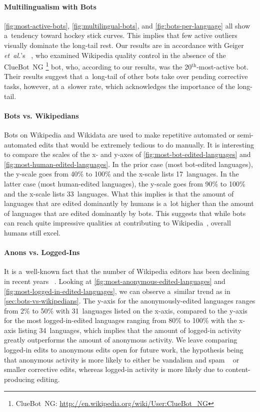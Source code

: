 \documentclass{sig-alternate}
\newcommand{\superscript}[1]{\ensuremath{^{\textrm{#1}}}}
\newcommand{\inlinelistingsize}{\fontsize{8pt}{11pt}}
\let\oldurl\url
\renewcommand{\url}[1]{\inlinelistingsize\oldurl{#1}}
\begin{document}
\paragraph{Multilingualism with Bots}

\autoref{fig:most-active-bots}, \autoref{fig:multilingual-bots},
and \autoref{fig:bots-per-language} all show a~tendency toward
hockey stick curves.
This implies that few active outliers visually dominate
the long-tail rest.
Our results are in accordance with Geiger \emph{et~al.}'s%
~\cite{geiger2013withoutbots}, who examined Wikipedia 
quality control in the absence of the ClueBot~NG%
\footnote{ClueBot~NG: \url{http://en.wikipedia.org/wiki/User:ClueBot_NG}} bot, who, according to our results,
was the 20\superscript{th}-most-active bot.
Their results suggest that a~long-tail of other bots
take over pending corrective tasks, however, at a~slower rate,
which acknowledges the importance of the long-tail.

\paragraph{Bots vs. Wikipedians}
\label{sec:bots-vs-wikipedians}

Bots on Wikipedia and Wikidata are used to make
repetitive automated or semi-automated edits
that would be extremely tedious to do manually.
It is interesting to compare the scales of the x- and y-axes of
\autoref{fig:most-bot-edited-languages} and
\autoref{fig:most-human-edited-languages}.
In the prior case (most bot-edited languages),
the y-scale goes from 40\% to 100\%
and the x-scale lists 17~languages.
In the latter case (most human-edited languages),
the y-scale goes from 90\% to 100\%
and the x-scale lists 33~languages.
What this implies is that the amount of languages that are
edited dominantly by humans is a~lot higher than the amount
of languages that are edited dominantly by bots.
This suggests that while bots can reach quite
impressive qualities at contributing to Wikipedia~\cite{guldbrandsson2013bots},
overall humans still excel.

\paragraph{Anons vs. Logged-Ins}

It is a~well-known fact that the number of Wikipedia editors
has been declining in recent years%
~\cite{halfaker2013wikipedia}.
Looking at \autoref{fig:most-anonymous-edited-languages} and
\autoref{fig:most-logged-in-edited-languages},
we can observe a~similar trend as in \autoref{sec:bots-vs-wikipedians}.
The y-axis for the anonymously-edited languages
ranges from 2\% to 50\% with 31~languages listed on the x-axis,
compared to the y-axis for the most logged-in-edited languages
ranging from 80\% to 100\% with the x-axis listing 34~languages,
which implies that the amount of logged-in activity
greatly outperforms the amount of anonymous activity.
We leave comparing logged-in edits to anonymous edits 
open for future work, the hypothesis being that anonymous activity
is more likely to either be vandalism and spam%
~\cite{alfonseca2013spam} or smaller corrective edits,
whereas logged-in activity is more likely
due to content-producing editing.
\end{document}
